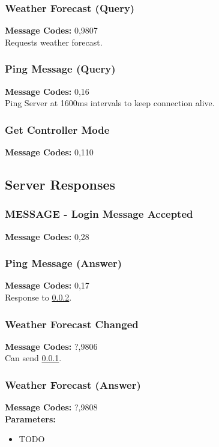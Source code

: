 \documentclass[11pt]{article}
\begin{document}
\subsubsection{Weather Forecast (Query)}
\label{msg:9807}
{\bf Message Codes: } 0,9807\\
Requests weather forecast.

\subsubsection{Ping Message (Query)}
\label{msg:16}
{\bf Message Codes: } 0,16\\
Ping Server at 1600ms intervals to keep connection alive.

\subsubsection{Get Controller Mode}
\label{msg:110}
{\bf Message Codes: } 0,110\\

\subsection{Server Responses}

\subsubsection{MESSAGE - Login Message Accepted}
\label{msg:28}
{\bf Message Codes: } 0,28

\subsubsection{Ping Message (Answer)}
\label{msg:17}
{\bf Message Codes: } 0,17\\
Response to \ref{msg:16}.

\subsubsection{Weather Forecast Changed}
\label{msg:9806}
{\bf Message Codes: } ?,9806\\
Can send \ref{msg:9807}.

\subsubsection{Weather Forecast (Answer)}
\label{msg:9808}
{\bf Message Codes: } ?,9808\\
{\bf Parameters: }
\small
\begin{itemize}
\item {\color{red} TODO}
\end{itemize}
\normalsize
\end{document}
